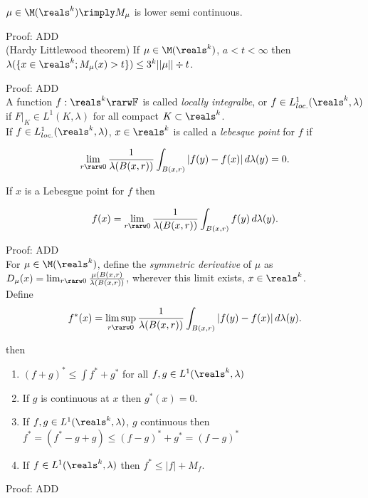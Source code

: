$\mu \in \M(\reals^k) \rimply M_\mu$ is lower semi continuous.

\noindent
Proof: ADD \\

(Hardy Littlewood theorem) If $\mu \in \M(\reals^k)$, $a < t < \infty$ then $\lambda(\{ x \in \reals^k; M_\mu(x) > t \} ) \le 3^k ||\mu|| \div t$.

\noindent
Proof: ADD \\

A function $f : \reals^k \rarw \mathbb{F}$ is called \emph{locally integralbe}, or $f \in L^1_{loc.}(\reals^k, \lambda)$ if $F|_K \in L^1(K, \lambda)$ for all compact $K \subset \reals^k$.  \\

If $f \in L^1_{loc.}(\reals^k, \lambda)$, $x \in \reals^k$ is called a \emph{lebesque point} for $f$ if

$$
\lim_{r \rarw 0} \frac{1}{ \lambda(B(x,r))} \int_{B(x,r)} |f(y)-f(x)| \, d \lambda(y) = 0.
$$

\noindent
If $x$ is a Lebesgue point for $f$ then

$$
f(x) = \lim_{r \rarw 0} \frac{1}{ \lambda(B(x,r))} \int_{B(x,r)} f(y) \, d \lambda(y).
$$


\noindent
Proof: ADD \\




For $\mu \in \M(\reals^k)$, define the \emph{symmetric derivative} of $\mu$ as $D_\mu(x) = \lim_{r \rarw 0} \frac{\mu(B(x,r)}{\lambda(B(x,r))}$, wherever this limit exists, $x \in \reals^k$. \\



Define 
$$
    f^*(x) = \limsup_{r \rarw 0} \frac{1}{ \lambda(B(x,r))} \int_{B(x,r)} |f(y)-f(x)| \, d \lambda(y) .
$$

\noindent
then
\begin{enumerate}[1)]
\item
$(f+g)^* \le \int f^* + g^*$ for all $f,g \in L^1(\reals^k, \lambda)$
\item 
If $g$ is continuous at $x$ then $g^*(x) = 0$.
\item
If $f,g \in L^1(\reals^k, \lambda)$, $g$ continuous then $f^* = (f^* - g + g) \le (f-g)^* + g^* = (f-g)^*$
\item
If $f \in L^1(\reals^k, \lambda)$ then $f^* \le |f| + M_f$.
\end{enumerate} 


\noindent
Proof: ADD \\



